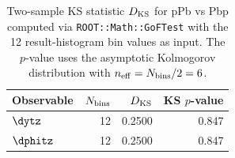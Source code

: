 \begin{table}[hbtp]
\centering
\begin{tabular}{|l|r|r|r|}
\hline
Observable & $N_{\rm bins}$ & $D_{\rm KS}$ & KS $p$-value \\
\hline
$\dytz$ & 12 & 0.2500 & 0.847 \\
$\dphitz$ & 12 & 0.2500 & 0.847 \\
\hline
\end{tabular}
\caption{Two-sample KS statistic $D_{\rm KS}$ for pPb vs Pbp computed via \texttt{ROOT::Math::GoFTest} with the 12 result-histogram bin values as input. The $p$-value uses the asymptotic Kolmogorov distribution with $n_{\rm eff} = N_{\rm bins}/2 = 6$.}
\label{table:combining_ks}
\end{table}
